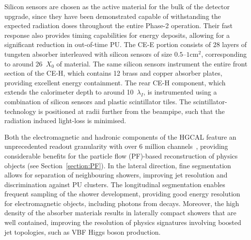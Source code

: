 Silicon sensors are chosen as the active material for the bulk of the detector upgrade, since they have been demonstrated capable of withstanding the expected radiation doses throughout the entire Phase-2 operation. Their fast response also provides timing capabilities for energy deposits, allowing for a significant reduction in out-of-time PU. The CE-E portion consists of 28 layers of tungsten absorber interleaved with silicon sensors of size $0.5$--$1\mathrm{cm}^{2}$, corresponding to around 26~$X_{0}$ of material. The same silicon sensors instrument the entire front section of the CE-H, which contains 12 brass and copper absorber plates, providing excellent energy containment. The rear CE-H component, which extends the calorimeter depth to around 10~$\lambda_{I}$, is instrumented using a combination of silicon sensors and plastic scintillator tiles. The scintillator-technology is positioned at radii further from the beampipe, such that the radiation induced light-loss is minimised. %

Both the electromagnetic and hadronic components of the HGCAL feature an unprecedented readout granularity with over 6 million channels~\cite{CMS_phase2_HGCAL}, providing considerable benefits for the particle flow (PF)-based reconstruction of physics objects (see Section~\ref{section:PF}). In the lateral direction, fine segmentation allows for separation of neighbouring showers, improving jet resolution and discrimination against PU clusters. The longitudinal segmentation enables frequent sampling of the shower development, providing good energy resolution for electromagnetic objects, including photons from \Hgg decays. Moreover, the high density of the absorber materials results in laterally compact showers that are well contained, improving the resolution of physics signatures involving boosted jet topologies, such as VBF Higgs boson production. %

